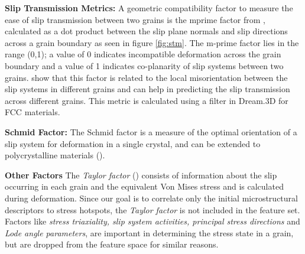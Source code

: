 \documentclass[preprint,1p,times,authoryear]{elsarticle}%
\begin{document}
\textbf{Slip Transmission Metrics: } 
A geometric compatibility factor to measure the ease of slip transmission between two grains is the mprime factor from \cite{Luster1995}, calculated as a dot product between the slip plane normals and slip directions across a grain boundary as seen in figure \ref{fig:stm}. The m-prime factor lies in the range (0,1); a value of 0 indicates incompatible deformation across the grain boundary and a value of 1 indicates co-planarity of slip systems between two grains. \cite{Bieler2014} show that this factor is related to the local misorientation between the slip systems in different grains and can help in predicting the slip transmission across different grains. This metric is calculated using a filter in Dream.3D for FCC materials.

\textbf{Schmid Factor: }
The Schmid factor is a measure of the optimal orientation of a slip system for deformation in a single crystal, and can be extended to polycrystalline materials (\cite{Piehler2009}).

\textbf{Other Factors}
The \textit{Taylor factor} (\cite{taylor1938plastic}) consists of information about the slip occurring in each grain and the equivalent Von Mises stress and is calculated during deformation. Since our goal is to correlate only the initial microstructural descriptors to stress hotspots, the \textit{Taylor factor} is not included in the feature set.  Factors like \textit{stress triaxiality, slip system activities, principal stress directions} and \textit{Lode angle parameters}, are important in determining the stress state in a grain, but are dropped from the feature space for similar reasons.
\end{document}
